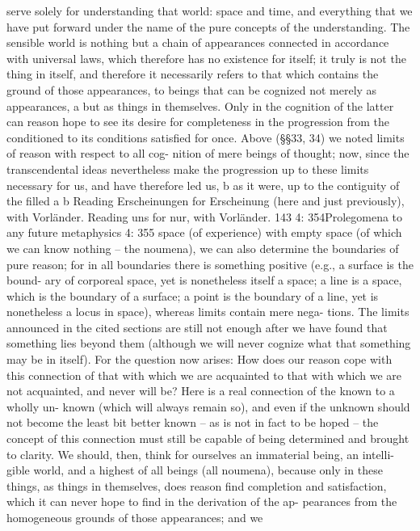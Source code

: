 serve solely for understanding that world: space and time, and everything
that we have put forward under the name of the pure concepts of the
understanding. The sensible world is nothing but a chain of appearances
connected in accordance with universal laws, which therefore has no
existence for itself; it truly is not the thing in itself, and therefore it
necessarily refers to that which contains the ground of those appearances,
to beings that can be cognized not merely as appearances, a but as things
in themselves. Only in the cognition of the latter can reason hope to see
its desire for completeness in the progression from the conditioned to
its conditions satisﬁed for once.
Above (§§33, 34) we noted limits of reason with respect to all cog-
nition of mere beings of thought; now, since the transcendental ideas
nevertheless make the progression up to these limits necessary for us,
and have therefore led us, b as it were, up to the contiguity of the ﬁlled
a
b
Reading Erscheinungen for Erscheinung (here and just previously), with Vorländer.
Reading uns for nur, with Vorländer.
143
4: 354Prolegomena to any future metaphysics
4: 355
space (of experience) with empty space (of which we can know nothing –
the noumena), we can also determine the boundaries of pure reason; for
in all boundaries there is something positive (e.g., a surface is the bound-
ary of corporeal space, yet is nonetheless itself a space; a line is a space,
which is the boundary of a surface; a point is the boundary of a line,
yet is nonetheless a locus in space), whereas limits contain mere nega-
tions. The limits announced in the cited sections are still not enough
after we have found that something lies beyond them (although we will
never cognize what that something may be in itself). For the question
now arises: How does our reason cope with this connection of that with
which we are acquainted to that with which we are not acquainted, and
never will be? Here is a real connection of the known to a wholly un-
known (which will always remain so), and even if the unknown should
not become the least bit better known – as is not in fact to be hoped –
the concept of this connection must still be capable of being determined
and brought to clarity.
We should, then, think for ourselves an immaterial being, an intelli-
gible world, and a highest of all beings (all noumena), because only in
these things, as things in themselves, does reason ﬁnd completion and
satisfaction, which it can never hope to ﬁnd in the derivation of the ap-
pearances from the homogeneous grounds of those appearances; and we
